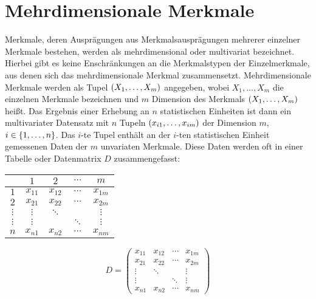 \documentclass{lecture}
\begin{document}
    \section*{Mehrdimensionale Merkmale}

    Merkmale, deren Ausprägungen aus Merkmalsausprägungen mehrerer einzelner Merkmale bestehen, werden als mehrdimensional oder multivariat bezeichnet.
    Hierbei gibt es keine Enschränkungen an die Merkmalstypen der Einzelmerkmale, aus denen sich das mehrdimensionale Merkmal zusammensetzt.
    Mehrdimensionale Merkmale werden als Tupel \(\parentheses*{X_1, \ldots, X_m}\) angegeben, wobei \(X_1, \ldots, X_m\) die einzelnen Merkmale bezeichnen und \(m\) Dimension des Merkmals \(\parentheses*{X_1, \ldots, X_m}\) heißt.
    Das Ergebnis einer Erhebung an \(n\) statistischen Einheiten ist dann ein multivariater Datensatz mit \(n\) Tupeln \(\parentheses*{x_{i1}, \ldots, x_{im}}\) der Dimension \(m\), \(i \in \braces*{1, \ldots, n}\).
    Das \(i\)-te Tupel enthält an der \(i\)-ten statistischen Einheit gemessenen Daten der \(m\) unvariaten Merkmale.
    Diese Daten werden oft in einer Tabelle oder Datenmatrix \(D\) zusammengefasst:
    \begin{center}
        \begin{minipage}{.35\linewidth}
            \begin{tabular}{c|cccc}
                & \(1\) & \(2\) & \(\cdots\) & \(m\)\\
                \hline
                \(1\) & \(x_{11}\) & \(x_{12}\) & \(\cdots\) & \(x_{1m}\)\\
                \(2\) & \(x_{21}\) & \(x_{22}\) & \(\cdots\) & \(x_{2m}\)\\
                \(\vdots\) & \(\vdots\) & \(\ddots\) & & \(\vdots\)\\
                \(\vdots\) & \(\vdots\) & & \(\ddots\) & \(\vdots\)\\
                \(n\) & \(x_{n1}\) & \(x_{n2}\) & \(\cdots\) & \(x_{nm}\)
            \end{tabular}
        \end{minipage}
        \begin{minipage}{.35\linewidth}
            \[
                D = \begin{pmatrix}
                    x_{11} & x_{12} & \cdots & x_{1m}\\
                    x_{21} & x_{22} & \cdots & x_{2m}\\
                    \vdots & \ddots & & \vdots\\
                    \vdots & & \ddots & \vdots\\
                    x_{n1} & x_{n2} & \cdots & x_{nm}
                \end{pmatrix}
            \]
        \end{minipage}
    \end{center}
\end{document}
